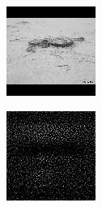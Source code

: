 \begin{figure}[H]\centering
  \setcounter{subfigure}{0}
  \begin{subfigure}[t]{0.13\textwidth}
    \centering
    \includegraphics[width=\linewidth]{img/one-trial/stimulus_1.png}
  \end{subfigure}
  \begin{subfigure}[t]{0.13\textwidth}
    \centering
    \includegraphics[width=\linewidth]{img/one-trial/intermediate-cnnv3/intermediate_0.png}

\end{subfigure}
\end{figure}
